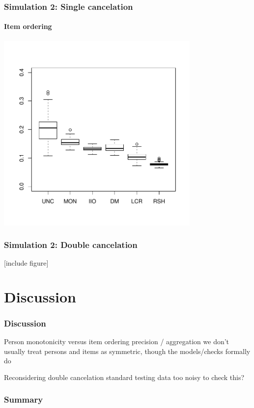 \documentclass[10pt,serif,professionalfont]{beamer}
\begin{document}
\begin{frame}
    \frametitle{Simulation 2: Single cancelation}
        \framesubtitle{Item ordering}

    \centering \includegraphics[width=0.75\textwidth]{./figs/violations_rows_weighted.pdf}

\end{frame}

\begin{frame}
    \frametitle{Simulation 2: Double cancelation}

    [include figure]

\end{frame}

\section{Discussion}

\begin{frame}
    \frametitle{Discussion}

    \begin{outline}
        \1 Person monotonicity versus item ordering
            \2 precision / aggregation
            \2 we don't usually treat persons and items as symmetric, though the models/checks formally do

        \1 Reconsidering double cancelation
            \2 standard testing data too noisy to check this?
    \end{outline}

\end{frame}

\begin{frame}
    \frametitle{Summary}
    
    \begin{outline}
        \1 
        
        \1 
        
        \1 
        
    \end{outline}

\end{frame}
\end{document}
